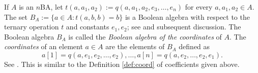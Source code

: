 \documentclass{amsart}
\numberwithin{equation}{section}
\theoremstyle{plain}
\theoremstyle{definition}
\begin{document}
If $A$ is an $n$BA, let $t(a,a_1, a_2) := q(a,a_1, a_2, e_3, \ldots, e_n)$ for every $a,a_1,a_2 \in A$. 
The set $B_A:=\{a \in A : t(a,b,b)=b\}$ is a Boolean algebra with respect to the ternary operation $t$ and constants $e_1, e_2$; 
see \cite[Lemma 4]{BLPS18} and subsequent discussion. 
The Boolean algebra $B_A$ is called the \emph{Boolean algebra of the coordinates} of $A$. 
The \emph{coordinates} of an element $a \in A$ are the elements of $B_A$ defined as 
\begin{equation*}
  a[1]=q(a,e_1,e_2, \ldots, e_2), \ldots, a[n]=q(a,e_2, \ldots,e_2,e_1)\text{.}
\end{equation*} 
See \cite[Definition 10, Lemma 6]{BLPS18}.   
This is similar to the Definition \ref{def:coord} of coefficients given above. 
\end{document}
